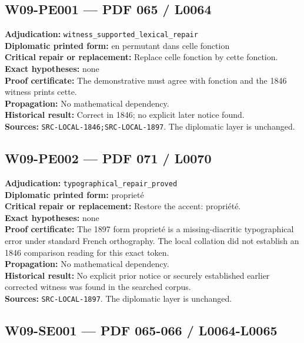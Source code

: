 \documentclass[
  10pt,
  a4paper,
]{scrreprt}
\begin{document}
\subsection{W09-PE001 --- PDF 065 /
L0064}\label{w09-pe001-pdf-065-l0064}

\textbf{Adjudication:} \texttt{witness\_supported\_lexical\_repair}\\
\textbf{Diplomatic printed form:} en permutant dans celle fonction\\
\textbf{Critical repair or replacement:} Replace celle fonction by cette
fonction.\\
\textbf{Exact hypotheses:} none\\
\textbf{Proof certificate:} The demonstrative must agree with fonction
and the 1846 witness prints cette.\\
\textbf{Propagation:} No mathematical dependency.\\
\textbf{Historical result:} Correct in 1846; no explicit later notice
found.\\
\textbf{Sources:} \texttt{SRC-LOCAL-1846;SRC-LOCAL-1897}. The diplomatic
layer is unchanged.

\subsection{W09-PE002 --- PDF 071 /
L0070}\label{w09-pe002-pdf-071-l0070}

\textbf{Adjudication:} \texttt{typographical\_repair\_proved}\\
\textbf{Diplomatic printed form:} proprieté\\
\textbf{Critical repair or replacement:} Restore the accent:
propriété.\\
\textbf{Exact hypotheses:} none\\
\textbf{Proof certificate:} The 1897 form proprieté is a
missing-diacritic typographical error under standard French orthography.
The local collation did not establish an 1846 comparison reading for
this exact token.\\
\textbf{Propagation:} No mathematical dependency.\\
\textbf{Historical result:} No explicit prior notice or securely
established earlier corrected witness was found in the searched
corpus.\\
\textbf{Sources:} \texttt{SRC-LOCAL-1897}. The diplomatic layer is
unchanged.

\subsection{W09-SE001 --- PDF 065-066 /
L0064-L0065}\label{w09-se001-pdf-065-066-l0064-l0065}
\end{document}
